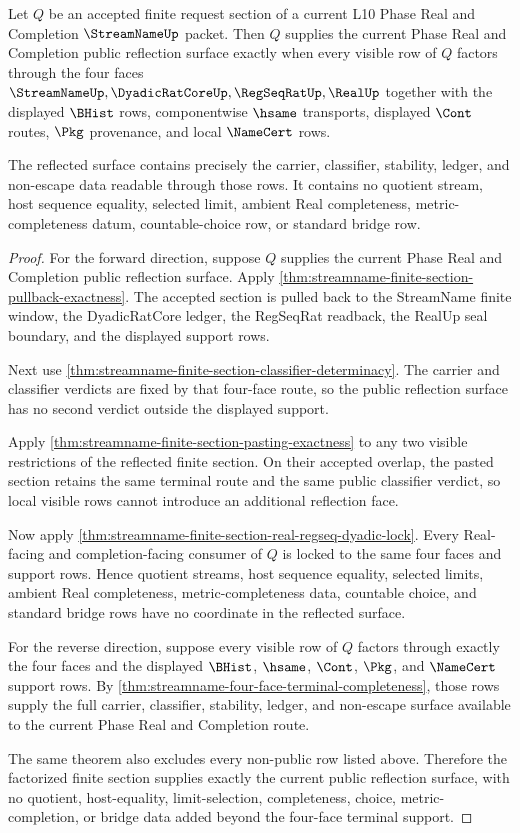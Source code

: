 \begin{theorem}
\label{thm:streamname-finite-section-terminal-reflection}
Let $Q$ be an accepted finite request section of a current L10 Phase Real and
Completion $\StreamNameUp$ packet. Then $Q$ supplies the current Phase Real and
Completion public reflection surface exactly when every visible row of $Q$
factors through the four faces
$\StreamNameUp,\DyadicRatCoreUp,\RegSeqRatUp,\RealUp$ together with the
displayed $\BHist$ rows, componentwise $\hsame$ transports, displayed $\Cont$
routes, $\Pkg$ provenance, and local $\NameCert$ rows.

The reflected surface contains precisely the carrier, classifier, stability,
ledger, and non-escape data readable through those rows. It contains no
quotient stream, host sequence equality, selected limit, ambient Real
completeness, metric-completeness datum, countable-choice row, or standard
bridge row.
\end{theorem}
\begin{proof}
For the forward direction, suppose $Q$ supplies the current Phase Real and
Completion public reflection surface. Apply
\autoref{thm:streamname-finite-section-pullback-exactness}. The accepted
section is pulled back to the StreamName finite window, the DyadicRatCore
ledger, the RegSeqRat readback, the RealUp seal boundary, and the displayed
support rows.

Next use
\autoref{thm:streamname-finite-section-classifier-determinacy}. The carrier
and classifier verdicts are fixed by that four-face route, so the public
reflection surface has no second verdict outside the displayed support.

Apply \autoref{thm:streamname-finite-section-pasting-exactness} to any two
visible restrictions of the reflected finite section. On their accepted
overlap, the pasted section retains the same terminal route and the same
public classifier verdict, so local visible rows cannot introduce an
additional reflection face.

Now apply \autoref{thm:streamname-finite-section-real-regseq-dyadic-lock}. Every
Real-facing and completion-facing consumer of $Q$ is locked to the same four
faces and support rows. Hence quotient streams, host sequence equality,
selected limits, ambient Real completeness, metric-completeness data,
countable choice, and standard bridge rows have no coordinate in the reflected
surface.

For the reverse direction, suppose every visible row of $Q$ factors through
exactly the four faces and the displayed $\BHist$, $\hsame$, $\Cont$, $\Pkg$,
and $\NameCert$ support rows. By
\autoref{thm:streamname-four-face-terminal-completeness}, those rows supply the
full carrier, classifier, stability, ledger, and non-escape surface available
to the current Phase Real and Completion route.

The same theorem also excludes every non-public row listed above. Therefore the
factorized finite section supplies exactly the current public reflection
surface, with no quotient, host-equality, limit-selection, completeness,
choice, metric-completion, or bridge data added beyond the four-face terminal
support.
\end{proof}

